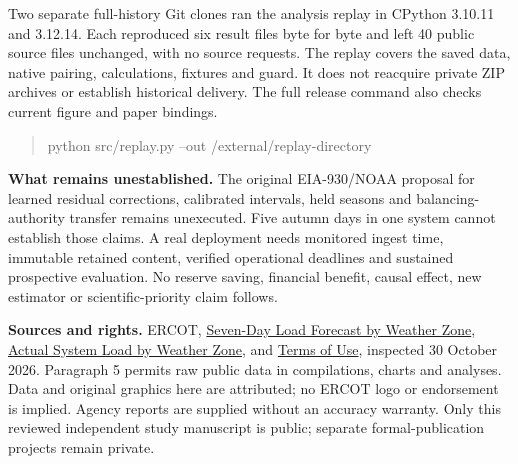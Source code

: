 \documentclass[10pt,letterpaper]{article}
\begin{document}
Two separate full-history Git clones ran the analysis replay in CPython 3.10.11 and 3.12.14. Each reproduced six result files byte for byte and left 40 public source files unchanged, with no source requests. The replay covers the saved data, native pairing, calculations, fixtures and guard. It does not reacquire private ZIP archives or establish historical delivery. The full release command also checks current figure and paper bindings.

\begin{quote}\ttfamily\small
python src/replay.py --out /external/replay-directory
\end{quote}

\textbf{What remains unestablished.} The original EIA-930/NOAA proposal for learned residual corrections, calibrated intervals, held seasons and balancing-authority transfer remains unexecuted. Five autumn days in one system cannot establish those claims. A real deployment needs monitored ingest time, immutable retained content, verified operational deadlines and sustained prospective evaluation. No reserve saving, financial benefit, causal effect, new estimator or scientific-priority claim follows.

\textbf{Sources and rights.} ERCOT, \href{https://www.ercot.com/mp/data-products/data-product-details?id=NP3-561-CD}{Seven-Day Load Forecast by Weather Zone}, \href{https://www.ercot.com/mp/data-products/data-product-details?id=NP6-345-CD}{Actual System Load by Weather Zone}, and \href{https://www.ercot.com/help/terms}{Terms of Use}, inspected 30 October 2026. Paragraph 5 permits raw public data in compilations, charts and analyses. Data and original graphics here are attributed; no ERCOT logo or endorsement is implied. Agency reports are supplied without an accuracy warranty. Only this reviewed independent study manuscript is public; separate formal-publication projects remain private.
\end{document}
